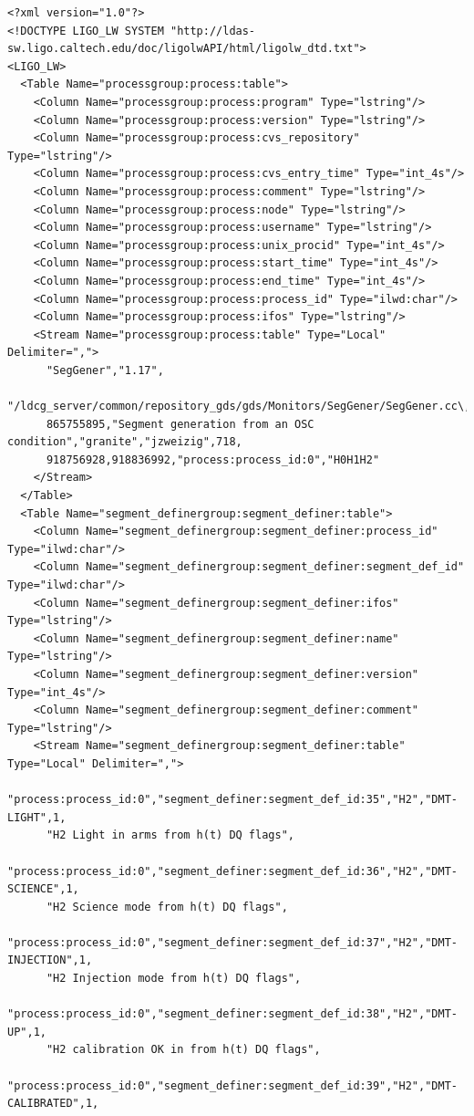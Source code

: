 {\tiny
\begin{verbatim}
<?xml version="1.0"?>
<!DOCTYPE LIGO_LW SYSTEM "http://ldas-sw.ligo.caltech.edu/doc/ligolwAPI/html/ligolw_dtd.txt">
<LIGO_LW>
  <Table Name="processgroup:process:table">
    <Column Name="processgroup:process:program" Type="lstring"/>
    <Column Name="processgroup:process:version" Type="lstring"/>
    <Column Name="processgroup:process:cvs_repository" Type="lstring"/>
    <Column Name="processgroup:process:cvs_entry_time" Type="int_4s"/>
    <Column Name="processgroup:process:comment" Type="lstring"/>
    <Column Name="processgroup:process:node" Type="lstring"/>
    <Column Name="processgroup:process:username" Type="lstring"/>
    <Column Name="processgroup:process:unix_procid" Type="int_4s"/>
    <Column Name="processgroup:process:start_time" Type="int_4s"/>
    <Column Name="processgroup:process:end_time" Type="int_4s"/>
    <Column Name="processgroup:process:process_id" Type="ilwd:char"/>
    <Column Name="processgroup:process:ifos" Type="lstring"/>
    <Stream Name="processgroup:process:table" Type="Local" Delimiter=",">
      "SegGener","1.17",
      "/ldcg_server/common/repository_gds/gds/Monitors/SegGener/SegGener.cc\,v",
      865755895,"Segment generation from an OSC condition","granite","jzweizig",718,
      918756928,918836992,"process:process_id:0","H0H1H2"
    </Stream>
  </Table>
  <Table Name="segment_definergroup:segment_definer:table">
    <Column Name="segment_definergroup:segment_definer:process_id" Type="ilwd:char"/>
    <Column Name="segment_definergroup:segment_definer:segment_def_id" Type="ilwd:char"/>
    <Column Name="segment_definergroup:segment_definer:ifos" Type="lstring"/>
    <Column Name="segment_definergroup:segment_definer:name" Type="lstring"/>
    <Column Name="segment_definergroup:segment_definer:version" Type="int_4s"/>
    <Column Name="segment_definergroup:segment_definer:comment" Type="lstring"/>
    <Stream Name="segment_definergroup:segment_definer:table" Type="Local" Delimiter=",">
      "process:process_id:0","segment_definer:segment_def_id:35","H2","DMT-LIGHT",1,
      "H2 Light in arms from h(t) DQ flags",
      "process:process_id:0","segment_definer:segment_def_id:36","H2","DMT-SCIENCE",1,
      "H2 Science mode from h(t) DQ flags",
      "process:process_id:0","segment_definer:segment_def_id:37","H2","DMT-INJECTION",1,
      "H2 Injection mode from h(t) DQ flags",
      "process:process_id:0","segment_definer:segment_def_id:38","H2","DMT-UP",1,
      "H2 calibration OK in from h(t) DQ flags",
      "process:process_id:0","segment_definer:segment_def_id:39","H2","DMT-CALIBRATED",1,

\end{verbatim}}

